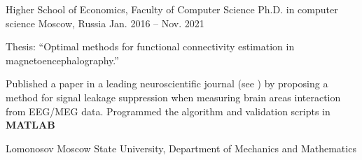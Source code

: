 \begin{cventries}
  \cventry
    {Higher School of Economics, Faculty of Computer Science}
    {Ph.D. in computer science}
    {Moscow, Russia}
    {Jan. 2016 -- Nov. 2021}
    {
      \begin{cvitems}
        \item {Thesis: ``Optimal methods for functional connectivity estimation in magnetoencephalography.''}
      \item{Published a paper in a leading neuroscientific journal (see \cite{psiicos}})
          by proposing a method for signal leakage suppression when measuring brain areas interaction from EEG/MEG data. Programmed the algorithm and validation scripts in \textbf{MATLAB}
      \end{cvitems}
    }
  \cventry
    {Lomonosov Moscow State University, Department of Mechanics and Mathematics}

\end{cventries}
